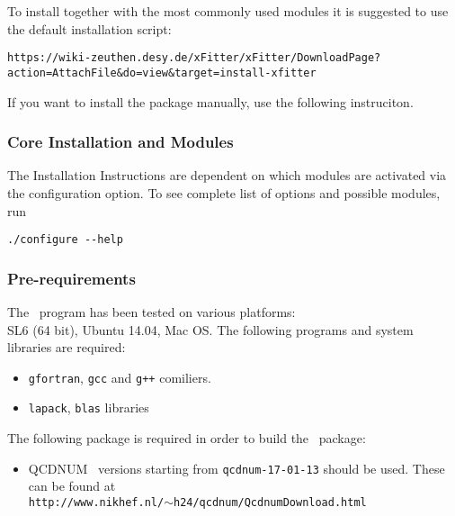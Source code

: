 
\label{sec:install}

To install {\fitter} together with the most commonly used modules it is suggested to use the default installation script:

{\scriptsize
{\tt https://wiki-zeuthen.desy.de/xFitter/xFitter/DownloadPage?action=AttachFile\&do=view\&target=install-xfitter}
}

If you want to install the package manually, use the following instruciton.

\subsubsection{Core Installation and Modules}
The Installation Instructions are dependent on which modules are activated via the configuration option. To see complete list of options and possible
modules, run
\begin{verbatim}
./configure --help
\end{verbatim}
\subsubsection{Pre-requirements}

The \fitter\ program has been tested on various platforms:\\
 SL6 (64 bit),  Ubuntu 14.04, Mac OS.  The following programs and system libraries are required:
\begin{itemize}
 \item {\tt gfortran}, {\tt gcc} and {\tt g++}  comiliers.   
 \item {\tt lapack}, {\tt blas} libraries
\end{itemize}

The following package is required in order to build the \fitter\ package:
\begin{itemize}
\item QCDNUM~\cite{qcdnum} versions starting from {\tt qcdnum-17-01-13} should be used. These can be found at \\
  {\tt http://www.nikhef.nl/$\sim$h24/qcdnum/QcdnumDownload.html}
\end{itemize}

